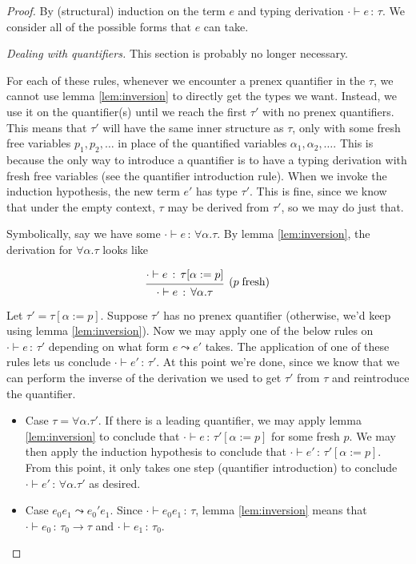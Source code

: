 \documentclass{article}
\newcommand{\hastp}[3]{#1 \vdash #2 \,:\, #3}
\newcommand{\step}[2]{#1 \leadsto #2}
\newcommand{\deduct}[3][]
{
  \begin{prooftree}
    \hypo{#2}
    \infer1[\text{#1}]{#3}
  \end{prooftree}
}
\begin{document}
\begin{proof}
  By (structural) induction on the term $e$ and typing derivation \(\hastp \cdot
  e \tau\). We consider all of the possible forms that \(e\) can take.

\textit{Dealing with quantifiers.} This section is probably no longer necessary.

For each of these rules, whenever we encounter a prenex quantifier in the
\(\tau\), we cannot use lemma \ref{lem:inversion} to directly get the types we
want. Instead, we use it on the quantifier(s) until we reach the first \(\tau'\)
with no prenex quantifiers. This means that \(\tau'\) will have the same inner
structure as \(\tau\), only with some fresh free variables \(p_1, p_2, \dots\)
in place of the quantified variables \(\alpha_1, \alpha_2, \dots\). This is
because the only way to introduce a quantifier is to have a typing derivation
with fresh free variables (see the quantifier introduction rule). When we invoke
the induction hypothesis, the new term \(e'\) has type \(\tau'\). This is fine,
since we know that under the empty context, \(\tau\) may be derived from
\(\tau'\), so we may do just that.

Symbolically, say we have some \(\hastp \cdot e {\forall \alpha.
  \tau}\). By lemma \ref{lem:inversion}, the derivation for \(\forall \alpha.
\tau\) looks like

\[
\deduct
    {\hastp{\cdot}{e}{\tau[\alpha := p]}}
    {\hastp{\cdot}{e}{\forall \alpha . \tau}}
    {(p\;\text{fresh})}
\]

Let \(\tau' = \tau[\alpha := p]\). Suppose \(\tau'\) has no prenex quantifier
(otherwise, we'd keep using lemma \ref{lem:inversion}). Now we may apply one of
the below rules on \(\hastp \cdot e {\tau'}\) depending on what form \(\step e
{e'}\) takes. The application of one of these rules lets us conclude \(\hastp
\cdot {e'} {\tau'}\). At this point we're done, since we know that we can
perform the inverse of the derivation we used to get \(\tau'\) from \(\tau\) and
reintroduce the quantifier.

\begin{itemize}
  \item Case \(\tau = \forall \alpha. \tau'\). If there is a leading quantifier,
    we may apply lemma \ref{lem:inversion} to conclude that \(\hastp \cdot e
    {\tau'[\alpha := p]}\) for some fresh \(p\). We may then apply the induction
    hypothesis to conclude that \(\hastp \cdot {e'} {\tau'[\alpha := p]}\). From
    this point, it only takes one step (quantifier introduction) to conclude
    \(\hastp \cdot {e'} {\forall \alpha. \tau'}\) as desired.
  \item Case \(\step {e_0 e_1} {e_0' e_1}\). Since \(\hastp \cdot {e_0 e_1}
    \tau\), lemma \ref{lem:inversion} means that \(\hastp \cdot {e_0} {\tau_0
      \to \tau}\) and \(\hastp \cdot {e_1} {\tau_0}\).


\end{itemize}
\end{proof}
\end{document}
